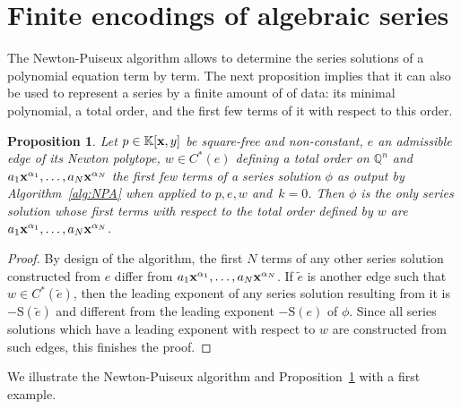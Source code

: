 \documentclass[a4paper,draft]{amsart}
\newtheorem{Proposition}{Proposition}
\theoremstyle{definition}
\begin{document}
\section{Finite encodings of algebraic series}

The Newton-Puiseux algorithm allows to determine the series solutions of a polynomial equation term by term. The next proposition implies that it can also be used to represent a series by a finite amount of of data: its minimal polynomial, a total order, and the first few terms of it with respect to this order.

\begin{Proposition}\label{prop:uniqueness}
Let $p\in\mathbb{K}[\bold{x},y]$ be square-free and non-constant, $e$ an admissible edge of its Newton polytope, $w\in C^*(e)$ defining a total order on $\mathbb{Q}^n$ and $a_1\bold{x}^{\alpha_1},\dots,a_N \bold{x}^{\alpha_N}$ the first few terms of a series solution $\phi$ as output by Algorithm~\ref{alg:NPA} when applied to $p,e,w$ and~$k=0$. Then $\phi$ is the only series solution whose first terms with respect to the total order defined by $w$ are $a_1\bold{x}^{\alpha_1},\dots,a_N \bold{x}^{\alpha_N}$.
\end{Proposition}
\begin{proof}
By design of the algorithm, the first $N$ terms of any other series solution constructed from $e$ differ from $a_1\bold{x}^{\alpha_1},\dots,a_N\bold{x}^{\alpha_N}$. If $\tilde{e}$ is another edge such that~$w\in C^*(\tilde{e})$, then the leading exponent of any series solution resulting from it is $-\mathrm{S}(\tilde{e})$ and different from the leading exponent $-\mathrm{S}(e)$ of $\phi$. Since all series solutions which have a leading exponent with respect to $w$ are constructed from such edges, this finishes the proof.
\end{proof}

We illustrate the Newton-Puiseux algorithm and Proposition~\ref{prop:uniqueness} with a first example.
\end{document}
